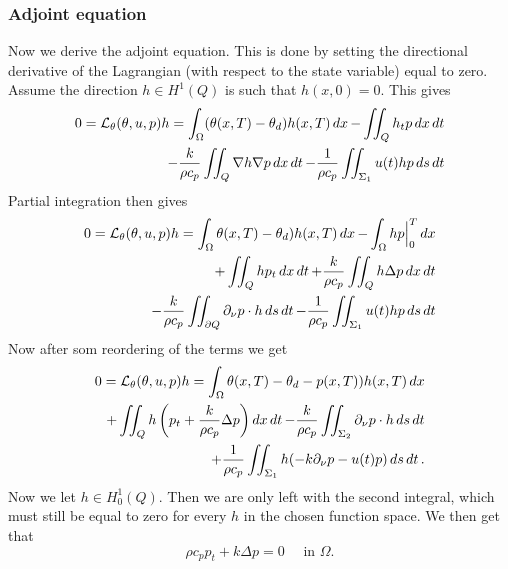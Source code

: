 \subsubsection{Adjoint equation}
Now we derive the adjoint equation. This is done by  setting the directional derivative of the Lagrangian (with respect to the state variable) equal to zero. Assume the direction $h\in H^1(Q)$ is such that $h(x, 0) = 0$. %
This gives
\begin{equation}
  \begin{aligned}
  0 = \mathcal{L}_\theta(\theta, u, p)h = \int_\Omega (\theta(x,T) - \theta_d)h(x, T)\mathop{dx} - \iint_Q h_t p\mathop{dx}\mathop{dt} \\
  - \frac{k}{\rho c_p}\iint_Q\nabla h\nabla p \mathop{dx}\mathop{dt}
  - \frac{1}{\rho c_p}\iint_{\Sigma_1} u(t)h p\mathop{ds}\mathop{dt}
  \end{aligned}
\end{equation}
Partial integration then gives
\begin{equation} %
  \begin{aligned}
  0 = \mathcal{L}_\theta(\theta, u, p)h = \int_\Omega \theta(x,T) - \theta_d)h(x, T)\dx - \int_\Omega hp\Big|_0^T \dx \\
  + \iint_Q h p_t\dxdt
  + \frac{k}{\rho c_p}\iint_Q h\Delta p \dxdt \\
  - \frac{k}{\rho c_p} \iint_{\partial Q}\partial_\nu p\cdot h\dsdt
  - \frac{1}{\rho c_p}\iint_{\Sigma_1} u(t)h p\dsdt
  \end{aligned}
\end{equation}
Now after som reordering of the terms we get
\begin{equation}
  \begin{aligned}
  0 = \mathcal{L}_\theta(\theta, u, p)h = \int_\Omega \theta(x,T) - \theta_d-p(x, T))h(x, T)\mathop{dx} \\
  + \iint_Q h \left( p_t + \frac{k}{\rho c_p}\Delta p\right) \mathop{dx}\mathop{dt}
   - \frac{k}{\rho c_p} \iint_{\Sigma_2}\partial_\nu p\cdot h\mathop{ds}\mathop{dt} \\
   + \frac{1}{\rho c_p} \iint_{\Sigma_1}h(  -k\partial_\nu p - u(t)p )\mathop{ds}\mathop{dt}.
  \end{aligned}
\end{equation}
Now we let $h\in H_0^1(Q)$. Then we are only left with the second integral, which must still be equal to zero for every $h$ in the chosen function space. We then get that
\begin{equation*}
  \rho c_p p_t + k\Delta p = 0 \quad\textrm{ in } \Omega.
\end{equation*}
